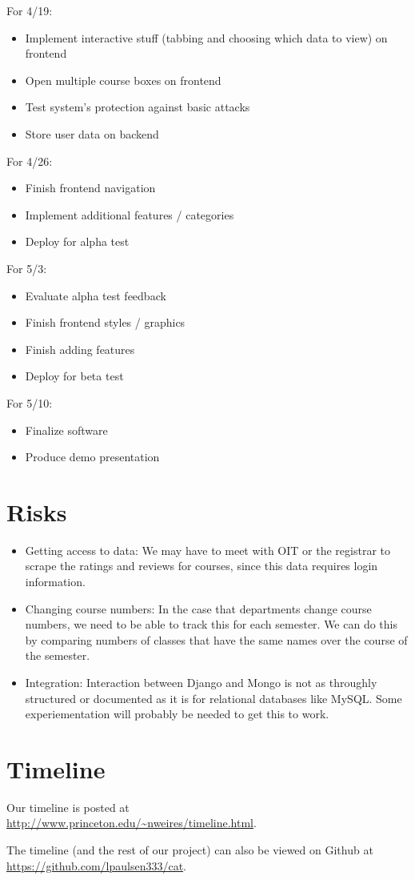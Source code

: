 \documentclass[11pt]{article}
\begin{document}
\par For 4/19:
\begin{itemize}
\item Implement interactive stuff (tabbing and choosing which data to view) on frontend
\item Open multiple course boxes on frontend
\item Test system's protection against basic attacks
\item Store user data on backend
\end{itemize}
\par For 4/26:
\begin{itemize}
\item Finish frontend navigation
\item Implement additional features / categories
\item Deploy for alpha test
\end{itemize}
\par For 5/3:
\begin{itemize}
\item Evaluate alpha test feedback
\item Finish frontend styles / graphics
\item Finish adding features
\item Deploy for beta test
\end{itemize}
\par For 5/10:
\begin{itemize}
\item Finalize software
\item Produce demo presentation
\end{itemize}

\section{Risks}
\begin{itemize}
\item Getting access to data: We may have to meet with OIT or the registrar to scrape the ratings and reviews for courses, since this data requires login information.
\item Changing course numbers: In the case that departments change course numbers, we need to be able to track this for each semester. We can do this by comparing numbers of classes that have the same names over the course of the semester.
\item Integration: Interaction between Django and Mongo is not as throughly structured or documented as it is for relational databases like MySQL. Some experiementation will probably be needed to get this to work.
\end{itemize}

\section{Timeline}
\par Our timeline is posted at \\
\url{http://www.princeton.edu/~nweires/timeline.html}.
\par The timeline (and the rest of our project) can also be viewed on Github at \\
\url{https://github.com/lpaulsen333/cat}.
\end{document}
